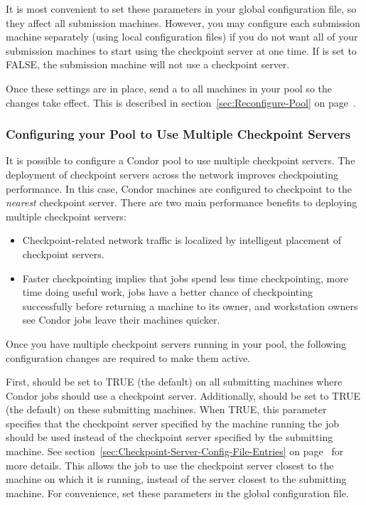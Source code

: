 It is most convenient to set these parameters in your global configuration file,
so they affect all submission machines.
However, you may configure each submission machine separately (using
local configuration files) if you do not want all of your submission machines
to start using the checkpoint server at one time.
If  is set to FALSE, the
submission machine will not use a checkpoint server.

Once these settings are in place, send a
 to all machines in your pool so the changes take
effect.
This is described in section~\ref{sec:Reconfigure-Pool} on
page~\pageref{sec:Reconfigure-Pool}.

\subsubsection{\label{sec:Configure-Multiple-Ckpt-Server} 
Configuring your Pool to Use Multiple Checkpoint Servers}


It is possible to configure a Condor pool to use multiple checkpoint
servers.
The deployment of
checkpoint servers across the
network improves checkpointing performance.
In this case, Condor machines are configured to checkpoint to the
\emph{nearest} checkpoint server.
There are two main performance benefits to deploying multiple checkpoint
servers:
\begin{itemize}
\item Checkpoint-related network traffic is localized by
intelligent placement of checkpoint servers.
\item Faster checkpointing implies that jobs spend less time
checkpointing, more time doing useful work, jobs have a better
chance of checkpointing successfully before returning a
machine to its owner, and workstation
owners see Condor jobs leave their machines quicker.
\end{itemize}

Once you have multiple checkpoint servers running in your pool, the
following configuration changes are required to make them active.

First,  should be set to TRUE (the default) on all
submitting machines where Condor jobs should use a checkpoint server.
Additionally,  should be set to
TRUE (the default) on these submitting machines.
When TRUE, this parameter specifies that the checkpoint server
specified by the machine running the job should be used instead of the
checkpoint server specified by the submitting machine.
See section~\ref{sec:Checkpoint-Server-Config-File-Entries} on
page~\pageref{sec:Checkpoint-Server-Config-File-Entries} for more
details.
This allows the job to use the checkpoint server closest to the
machine on which it is running, instead of the server closest to the
submitting machine.
For convenience, set these parameters in the
global configuration file.

